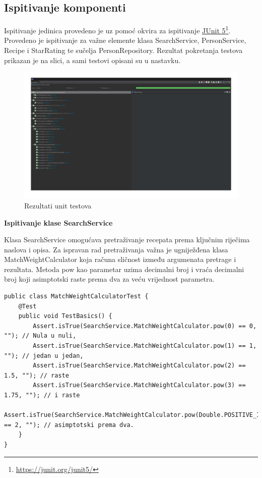 			\subsection{Ispitivanje komponenti}
			Ispitivanje jedinica provedeno je uz pomoć okvira za ispitivanje \href{https://junit.org/junit5/}{JUnit 5}\footnote{\url{https://junit.org/junit5/}}. Provedeno je ispitivanje za važne elemente klasa SearchService, PersonService, Recipe i StarRating te sučelja PersonRepository. Rezultat pokretanja testova prikazan je na slici, a sami testovi opisani su u nastavku.
			\begin{figure}[H]
				\includegraphics[scale=0.3]{slike/unit_test_screenshot.png} %
				\centering
				\caption{Rezultati unit testova}
				\label{fig:Rezultati unit testova}
			\end{figure}
			
			\noindent\textbf{Ispitivanje klase SearchService}
			
			Klasa SearchService omogućava pretraživanje recepata prema ključnim riječima naslova i opisa. Za ispravan rad pretraživanja važna je ugniježđena klasa MatchWeightCalculator koja računa sličnost između argumenata pretrage i rezultata. Metoda pow kao parametar uzima decimalni broj i vraća decimalni broj koji asimptotski raste prema dva za veću vrijednost parametra.
			\begin{lstlisting}
public class MatchWeightCalculatorTest {
	@Test
	public void TestBasics() {
		Assert.isTrue(SearchService.MatchWeightCalculator.pow(0) == 0, ""); // Nula u nuli,
		Assert.isTrue(SearchService.MatchWeightCalculator.pow(1) == 1, ""); // jedan u jedan,
		Assert.isTrue(SearchService.MatchWeightCalculator.pow(2) == 1.5, ""); // raste
		Assert.isTrue(SearchService.MatchWeightCalculator.pow(3) == 1.75, ""); // i raste
		Assert.isTrue(SearchService.MatchWeightCalculator.pow(Double.POSITIVE_INFINITY) == 2, ""); // asimptotski prema dva.
	}
}
			\end{lstlisting}
			
